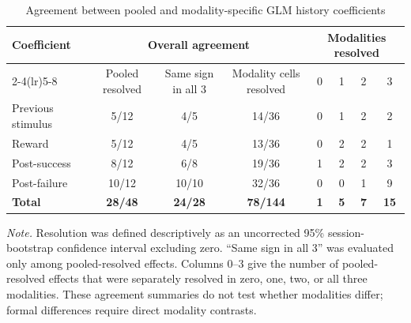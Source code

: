 \begin{table}[htbp]
\centering
\caption{Agreement between pooled and modality-specific GLM history coefficients}
\label{tab:pooled-modality-bridge}
\begin{tabular}{lccccccc}
\toprule
Coefficient & \multicolumn{3}{c}{Overall agreement} & \multicolumn{4}{c}{Modalities resolved} \\
\cmidrule(lr){2-4}\cmidrule(lr){5-8}
 & Pooled resolved & Same sign in all 3 & Modality cells resolved & 0 & 1 & 2 & 3 \\
\midrule
Previous stimulus & 5/12 & 4/5 & 14/36 & 0 & 1 & 2 & 2 \\
Reward & 5/12 & 4/5 & 13/36 & 0 & 2 & 2 & 1 \\
Post-success & 8/12 & 6/8 & 19/36 & 1 & 2 & 2 & 3 \\
Post-failure & 10/12 & 10/10 & 32/36 & 0 & 0 & 1 & 9 \\
\midrule
\textbf{Total} & \textbf{28/48} & \textbf{24/28} & \textbf{78/144} & \textbf{1} & \textbf{5} & \textbf{7} & \textbf{15} \\
\bottomrule
\end{tabular}
\vspace{4pt}
\par\noindent
\begin{minipage}{\linewidth}\small
\textit{Note.} Resolution was defined descriptively as an uncorrected 95\% session-bootstrap confidence interval excluding zero. ``Same sign in all 3'' was evaluated only among pooled-resolved effects. Columns 0--3 give the number of pooled-resolved effects that were separately resolved in zero, one, two, or all three modalities. These agreement summaries do not test whether modalities differ; formal differences require direct modality contrasts.
\end{minipage}
\end{table}